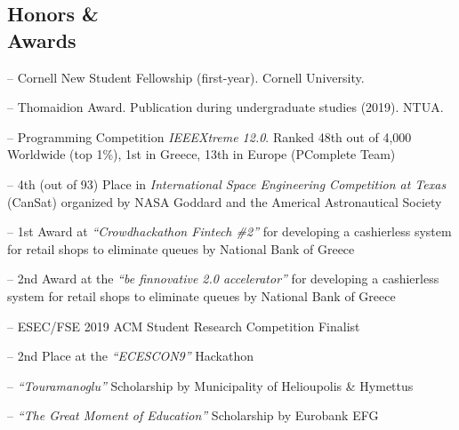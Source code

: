 \documentclass[margin]{res}
\begin{document}
\begin{resume}
\section{Honors \& \\ Awards} 
\begin{compactitem}
	\item[--] Cornell New Student Fellowship (first-year). Cornell University. 
	\item[--] Thomaidion Award. Publication during undergraduate studies (2019). NTUA. 
    \item[--] Programming Competition \emph{IEEEXtreme 12.0}. Ranked 48th out of 4,000 Worldwide (top 1\%), 1st in Greece, 13th in Europe (PComplete Team)
    \item[--] 4th (out of 93) Place in \emph{International Space Engineering  Competition at Texas} (CanSat) organized by NASA Goddard and the Americal Astronautical Society
    \item[--] 1st Award at \emph{``Crowdhackathon Fintech \#2''} for developing a cashierless system for retail shops to eliminate queues by National Bank of Greece
    \item[--] 2nd Award at the \emph{``be finnovative 2.0 accelerator''} for developing a cashierless system for retail shops to eliminate queues by National Bank of Greece
    \item[--] ESEC/FSE 2019 ACM Student Research Competition Finalist
    \item[--] 2nd Place at the \emph{``ECESCON9''} Hackathon 
    \item [--] \emph{``Touramanoglu''} Scholarship by Municipality of Helioupolis \& Hymettus
    \item [--] \emph{``The Great Moment of Education''} Scholarship by Eurobank EFG 

\end{compactitem}



\end{resume}
\end{document}
